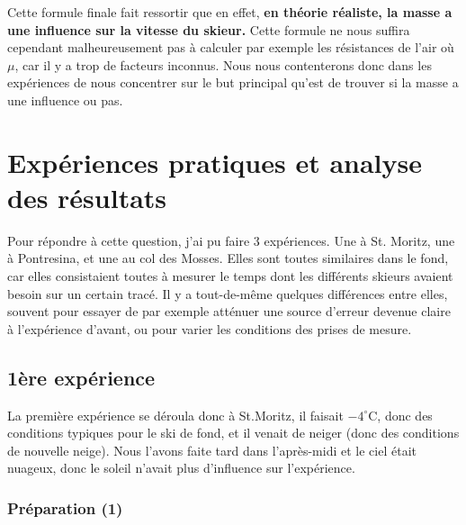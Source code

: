 \documentclass{article}
\begin{document}
\vspace{0.2cm}
Cette formule finale fait ressortir que en effet, \textbf{en théorie réaliste, la masse a une influence sur la vitesse du skieur.}
Cette formule ne nous suffira cependant malheureusement pas à calculer par exemple les résistances de l'air où $\mu$, car il y a trop de facteurs inconnus. Nous nous contenterons donc dans les expériences de nous concentrer sur le but principal qu'est de trouver si la masse a une influence ou pas.


\section{Expériences pratiques et analyse des résultats}

Pour répondre à cette question, j'ai pu faire 3 expériences. Une à St. Moritz, une à Pontresina, et une au col des Mosses. Elles sont toutes similaires dans le fond, car elles consistaient toutes à mesurer le temps dont les différents skieurs avaient besoin sur un certain tracé. Il y a tout-de-même quelques différences entre elles, souvent pour essayer de par exemple atténuer une source d'erreur devenue claire à l'expérience d'avant, ou pour varier les conditions des prises de mesure.


\subsection{1ère expérience}

La première expérience se déroula donc à St.Moritz, il faisait $-4^\circ$C, donc des conditions typiques pour le ski de fond, et il venait de neiger (donc des conditions de nouvelle neige). Nous l'avons faite tard dans l'après-midi et le ciel était nuageux, donc le soleil n'avait plus d'influence sur l'expérience.

\subsubsection{Préparation (1)}
\end{document}
